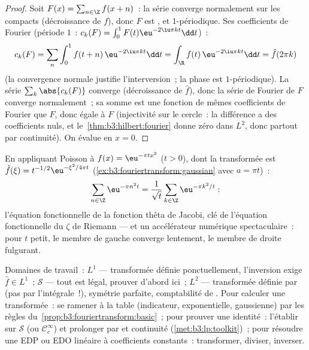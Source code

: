 \begin{proof}
Soit $F(x) = \sum_{n\in\Z}f(x + n)$~: la série converge
normalement sur les compacts (décroissance de $f$), donc $F$
est , et $1$-périodique. Ses coefficients de Fourier
(période $1$~: $c_k(F) = \int_0^1F(t)\eu^{-2\iu\pi kt}\dd
t$)~:
\[
c_k(F) = \sum_n\int_0^1 f(t + n)\,\eu^{-2\iu\pi kt}\dd t
= \int_\R f(t)\,\eu^{-2\iu\pi kt}\dd t = \hat f(2\pi k)
\]
(la convergence normale justifie l'interversion~; la phase est
$1$-périodique). La série $\sum_k\abs{c_k(F)}$ converge
(décroissance de $\hat f$), donc la série de Fourier de $F$
converge normalement~; sa somme est une fonction  de
mêmes coefficients de Fourier que $F$, donc égale à $F$
(injectivité sur le cercle~: la différence a des coefficients
nuls, et le~\cref{thm:b3:hilbert:fourier} donne zéro dans $L^2$,
donc partout par continuité). On évalue en $x = 0$.
\end{proof}

\begin{example}
\label{ex:b3:fouriertransform:theta}
En appliquant Poisson à $f(x) = \eu^{-\pi tx^2}$ ($t > 0$),
dont la transformée est $\hat f(\xi) =
t^{-1/2}\eu^{-\xi^2/4\pi t}$
(\cref{ex:b3:fouriertransform:gaussian} avec $a = \pi t$)~:
\[
\sum_{n\in\Z}\eu^{-\pi n^2t}
= \frac1{\sqrt t}\sum_{k\in\Z}\eu^{-\pi k^2/t} :
\]
l'équation fonctionnelle de la fonction thêta de Jacobi, clé
de l'équation fonctionnelle du $\zeta$ de Riemann --- et un
accélérateur numérique spectaculaire~: pour $t$ petit, le
membre de gauche converge lentement, le membre de droite
fulgurant.
\end{example}

\begin{method}\label{met:b3:fouriertransform:method}
Domaines de travail~: $L^1$ --- transformée définie
ponctuellement, l'inversion exige $\hat f \in L^1$~;
$\mathcal S$ --- tout est légal, prouver d'abord ici~; $L^2$
--- transformée définie par  (pas par l'intégrale~!),
symétrie parfaite, comptabilité de . Pour calculer une
transformée~: se ramener à la table (indicateur, exponentielle,
gaussienne) par les règles du~\cref{prop:b3:fouriertransform:basic}~; pour prouver une
identité~: l'établir sur $\mathcal S$ (ou $\mathcal
C_c^\infty$) et prolonger par  et continuité
(\cref{met:b3:lp:toolkit})~; pour résoudre une EDP ou EDO
linéaire à coefficients constants~: transformer, diviser,
inverser.
\end{method}

